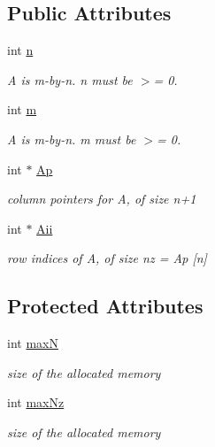 \subsection*{Public Attributes}
\begin{DoxyCompactItemize}
\item 
int \hyperlink{classg2o_1_1MatrixStructure_aa91f296406c17ab3a826d03bf75cfea7}{n}
\begin{DoxyCompactList}\small\item\em A is m-\/by-\/n. n must be $>$= 0. \end{DoxyCompactList}\item 
int \hyperlink{classg2o_1_1MatrixStructure_a9cceed2097dcbaa27ed88b7005440616}{m}
\begin{DoxyCompactList}\small\item\em A is m-\/by-\/n. m must be $>$= 0. \end{DoxyCompactList}\item 
int $\ast$ \hyperlink{classg2o_1_1MatrixStructure_aeeff8e78fb766a433aecbfda4a2e3ffc}{Ap}
\begin{DoxyCompactList}\small\item\em column pointers for A, of size n+1 \end{DoxyCompactList}\item 
int $\ast$ \hyperlink{classg2o_1_1MatrixStructure_a7984bf429b8694070ab8db5f5852d8bb}{Aii}
\begin{DoxyCompactList}\small\item\em row indices of A, of size nz = Ap \mbox{[}n\mbox{]} \end{DoxyCompactList}\end{DoxyCompactItemize}
\subsection*{Protected Attributes}
\begin{DoxyCompactItemize}
\item 
int \hyperlink{classg2o_1_1MatrixStructure_a098e58ed3d37bf957307a64f7dc55f32}{maxN}
\begin{DoxyCompactList}\small\item\em size of the allocated memory \end{DoxyCompactList}\item 
int \hyperlink{classg2o_1_1MatrixStructure_a049708086bd4123721351d0580ce5ba1}{max\+Nz}
\begin{DoxyCompactList}\small\item\em size of the allocated memory \end{DoxyCompactList}\end{DoxyCompactItemize}


